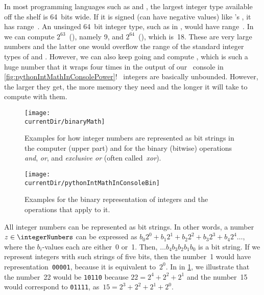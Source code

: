 In most programming languages such as  and , the largest integer type available off the shelf is 64~bits wide.
If it is signed (can have negative values) like 's , it has range~.
An unsinged 64~bit integer type, such as  in , would have range~.
In \python\, we can compute $2^{63}$~(), namely 9, and
$2^{64}$~(), which is~18.
These are very large numbers and the latter one would overflow the range of the standard integer types of  and .
However, we can also keep going and compute , which is such a huge number that it wraps four times in the output of our \python\ console in \cref{fig:pythonIntMathInConsolePower}!
\python\ integers are basically unbounded.
However, the larger they get, the more memory they need and the longer it will take to compute with them.
\endhsection%
%
%
\label{sec:int:bitstrings}%
%
%
%
\begin{figure}%
\centering%
\texttt{[image: \\currentDir/binaryMath]}%
\caption{Examples for how integer numbers are represented as bit strings in the computer (upper part) and for the binary (bitwise) operations \emph{and}, \emph{or}, and \emph{exclusive or} (often called~\emph{xor}).}%
\label{fig:binaryMath}%
\end{figure}
\begin{figure}%
\centering%
\texttt{[image: \\currentDir/pythonIntMathInConsoleBin]}%
\caption{Examples for the binary representation of integers and the operations that apply to it.}%
\label{fig:pythonIntMathInConsoleBin}%
\end{figure}

All integer numbers can be represented as bit strings.
In other words, a number $z\in\integerNumbers$ can be expressed as $b_0 2^0 + b_1 2^1 + b_2 2^2 + b_3 2^3 + b_4 2^4\dots$, where the $b_i$-values each are either~0 or~1.
Then, $\dots b_4 b_3 b_2 b_1 b_0$ is a bit string.
If we represent integers with such strings of five bits, then the number~1 would have representation~\texttt{00001}, because it is equivalent to~$2^0$.
In in \cref{fig:binaryMath}, we illustrate that the number~22 would be \texttt{10110} because $22=2^4+2^2+2^1$ and the number~15 would correspond to \texttt{01111}, as~$15=2^3+2^2+2^1+2^0$.

